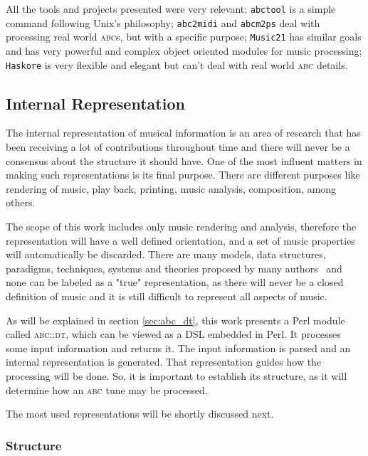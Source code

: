 \documentclass[a4paper,UKenglish]{oasics}
\newcommand{\abc}{\textsc{abc}}
\newcommand{\abcdt}{\textsc{abc::dt}}
\newcommand{\abcmtops}{\texttt{abcm2ps}}
\newcommand{\abctomidi}{\texttt{abc2midi}}
\begin{document}
    All the tools and projects presented were very relevant: \texttt{abctool} is a simple command
    following Unix's philosophy; \abctomidi{} and \abcmtops{} deal with processing real world
    \abc{}s, but with a specific purpose; \texttt{Music21} has similar goals and has very powerful
    and complex object oriented modules for music processing; \texttt{Haskore} is very flexible and
    elegant but can't deal with real world \abc{} details.

\subsection{Internal Representation}

    The internal representation of musical information is an area of research that has been
    receiving a lot of contributions throughout time and there will never be a consensus about the
    structure it should have. One of the most influent matters in making such representations is its
    final purpose.  There are different purposes like rendering of music, play back, printing, music
    analysis, composition, among others.

    The scope of this work includes only music rendering and analysis, therefore the representation
    will have a well defined orientation, and a set of music properties will automatically be
    discarded.  There are many models, data structures, paradigms, techniques, systems and theories
    proposed by many
    authors~\cite{Brinkman1984,Buxton1978,Bilmes1992,Smaill1993,Wiggins1989,Dannenberg1993} and none
    can be labeled as a "true" representation, as there will never be a closed definition of music
    and it is still difficult to represent all aspects of music.

    As will be explained in section \ref{sec:abc_dt}, this work presents a Perl module called
    \abcdt{}, which can be viewed as a DSL embedded in Perl. It processes some input information and %
    returns it. The input information is parsed and an internal representation is generated. That
    representation guides how the processing will be done. So, it is important to establish its
    structure, as it will determine how an \abc{} tune may be processed.

    The most used representations will be shortly discussed next.

\subsubsection{Structure}
\end{document}
